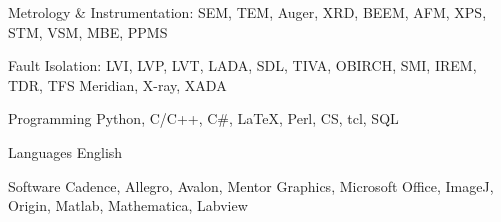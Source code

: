 

\begin{cvskills}

  \cvskill
    {Metrology \& Instrumentation:} %
    {SEM, TEM, Auger, XRD, BEEM, AFM, XPS, STM, VSM, MBE, PPMS} %

  \cvskill
    {Fault Isolation:} %
    {LVI, LVP, LVT, LADA, SDL, TIVA, OBIRCH, SMI, IREM, TDR, TFS Meridian, X-ray, XADA} %

  \cvskill
    {Programming} %
    {Python, C/C++, C\#, LaTeX, Perl, CS, tcl, SQL} %

  \cvskill
    {Languages} %
    {English} %

  \cvskill
    {Software} %
    {Cadence, Allegro, Avalon, Mentor Graphics, Microsoft Office, ImageJ, Origin, Matlab, Mathematica, Labview} %


\end{cvskills}
